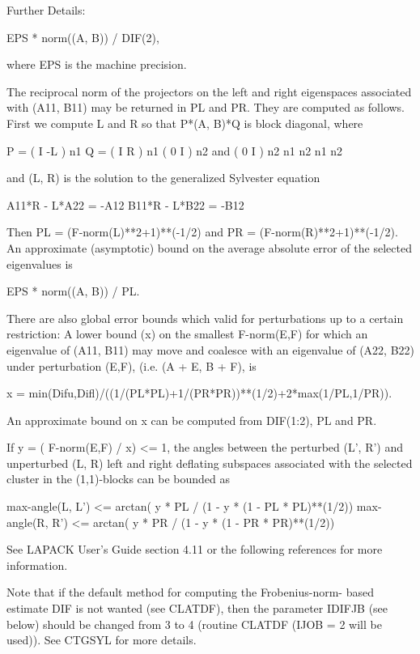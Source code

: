 \begin{DoxyParagraph}{Further Details\+: }
\begin{DoxyVerb}
       EPS * norm((A, B)) / DIF(2),

  where EPS is the machine precision.

  The reciprocal norm of the projectors on the left and right
  eigenspaces associated with (A11, B11) may be returned in PL and PR.
  They are computed as follows. First we compute L and R so that
  P*(A, B)*Q is block diagonal, where

       P = ( I -L ) n1           Q = ( I R ) n1
           ( 0  I ) n2    and        ( 0 I ) n2
             n1 n2                    n1 n2

  and (L, R) is the solution to the generalized Sylvester equation

       A11*R - L*A22 = -A12
       B11*R - L*B22 = -B12

  Then PL = (F-norm(L)**2+1)**(-1/2) and PR = (F-norm(R)**2+1)**(-1/2).
  An approximate (asymptotic) bound on the average absolute error of
  the selected eigenvalues is

       EPS * norm((A, B)) / PL.

  There are also global error bounds which valid for perturbations up
  to a certain restriction:  A lower bound (x) on the smallest
  F-norm(E,F) for which an eigenvalue of (A11, B11) may move and
  coalesce with an eigenvalue of (A22, B22) under perturbation (E,F),
  (i.e. (A + E, B + F), is

   x = min(Difu,Difl)/((1/(PL*PL)+1/(PR*PR))**(1/2)+2*max(1/PL,1/PR)).

  An approximate bound on x can be computed from DIF(1:2), PL and PR.

  If y = ( F-norm(E,F) / x) <= 1, the angles between the perturbed
  (L', R') and unperturbed (L, R) left and right deflating subspaces
  associated with the selected cluster in the (1,1)-blocks can be
  bounded as

   max-angle(L, L') <= arctan( y * PL / (1 - y * (1 - PL * PL)**(1/2))
   max-angle(R, R') <= arctan( y * PR / (1 - y * (1 - PR * PR)**(1/2))

  See LAPACK User's Guide section 4.11 or the following references
  for more information.

  Note that if the default method for computing the Frobenius-norm-
  based estimate DIF is not wanted (see CLATDF), then the parameter
  IDIFJB (see below) should be changed from 3 to 4 (routine CLATDF
  (IJOB = 2 will be used)). See CTGSYL for more details.\end{DoxyVerb}
 
\end{DoxyParagraph}
